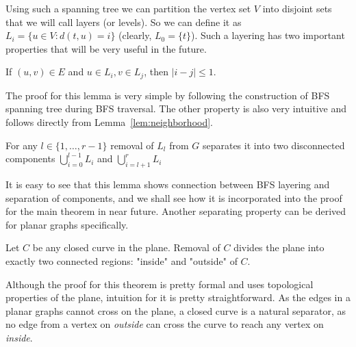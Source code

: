 Using such a spanning tree we can partition the vertex set $V$ into disjoint sets
that we will call layers (or levels). So we can define it as $L_i = \{ u
\in V \colon d(t, u) = i\}$ (clearly, $L_0 = \{ t \} $).
Such a layering has two important properties that will be very useful in the
future.
\begin{lemma}\label{lem:neighborhood}
    If $(u, v) \in E$ and $u \in L_i, v \in L_j$, then $|i - j| \leq 1$.
\end{lemma}
The proof for this lemma is very simple by following the construction of BFS
spanning tree during BFS traversal. The other property is also very intuitive
and follows directly from Lemma~\ref{lem:neighborhood}.
\begin{lemma} \label{lem:separation}
    For any $l \in \{ 1, \dots, r-1 \}$ removal of $L_l$ from $G$ separates it into two disconnected components
    $\bigcup_{i=0}^{l-1} L_i$ and $\bigcup_{i=l+1}^{r} L_i$
\end{lemma}

It is easy to see that this lemma shows connection between BFS layering and 
separation of components, and we shall see how it is incorporated into the proof
for the main theorem in near future. Another separating property can be derived
for planar graphs specifically.

\begin{theorem} \cite{liptonSeparatorTheoremPlanar1979} \label{thm:jordan-curve}
    Let $C$ be any closed curve in the plane. Removal of $C$ divides the plane
    into exactly two connected regions: "inside" and "outside" of $C$.
\end{theorem}

Although the proof for this theorem is pretty formal and uses topological properties
of the plane, intuition for it is pretty straightforward. As the edges in a planar 
graphs cannot cross on the plane, a closed curve is a natural separator, as no edge
from a vertex on \textit{outside} can cross the curve to reach any vertex on \textit{inside}.


